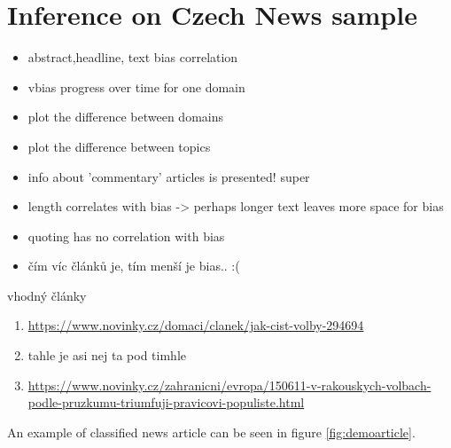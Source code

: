 \chapter{Inference on Czech News sample}\label{inference}

\begin{itemize}
    \item abstract,headline, text bias correlation
    \item vbias progress over time for one domain
    \item plot the difference between domains
    \item plot the difference between topics
    \item info about 'commentary' articles is presented! super
    \item length correlates with bias -> perhaps longer text leaves more space for bias
    \item quoting has no correlation with bias
    \item čím víc článků je, tím menší je bias.. :(
\end{itemize}

vhodný články
\begin{enumerate}
    \item \url{https://www.novinky.cz/domaci/clanek/jak-cist-volby-294694}
    \item tahle je asi nej ta pod timhle
    \item \url{https://www.novinky.cz/zahranicni/evropa/150611-v-rakouskych-volbach-podle-pruzkumu-triumfuji-pravicovi-populiste.html}
\end{enumerate}

An example of classified news article can be seen in figure \ref{fig:demoarticle}.

